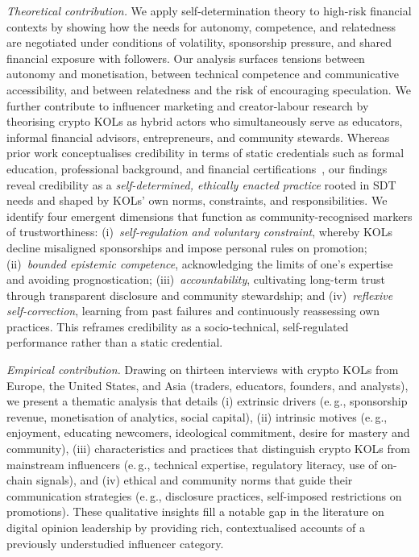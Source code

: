 \emph{Theoretical contribution.} We apply self-determination theory to high-risk financial contexts by showing how the needs for autonomy, competence, and relatedness are negotiated under conditions of volatility, sponsorship pressure, and shared financial exposure with followers. Our analysis surfaces tensions between autonomy and monetisation, between technical competence and communicative accessibility, and between relatedness and the risk of encouraging speculation. We further contribute to influencer marketing and creator-labour research by theorising crypto KOLs as hybrid actors who simultaneously serve as educators, informal financial advisors, entrepreneurs, and community stewards. Whereas prior work conceptualises credibility in terms of static credentials such as formal education, professional background, and financial certifications~\cite{NurhandayaniWhoDeserves2025}, our findings reveal credibility as a \emph{self-determined, ethically enacted practice} rooted in SDT needs and shaped by KOLs' own norms, constraints, and responsibilities. We identify four emergent dimensions that function as community-recognised markers of trustworthiness: (i)~\emph{self-regulation and voluntary constraint}, whereby KOLs decline misaligned sponsorships and impose personal rules on promotion; (ii)~\emph{bounded epistemic competence}, acknowledging the limits of one's expertise and avoiding prognostication; (iii)~\emph{accountability}, cultivating long-term trust through transparent disclosure and community stewardship; and (iv)~\emph{reflexive self-correction}, learning from past failures and continuously reassessing own practices. This reframes credibility as a socio-technical, self-regulated performance rather than a static credential.

\emph{Empirical contribution.} Drawing on thirteen interviews with crypto KOLs from Europe, the United States, and Asia (traders, educators, founders, and analysts), we present a thematic analysis that details (i) extrinsic drivers (e.\,g., sponsorship revenue, monetisation of analytics, social capital), (ii) intrinsic motives (e.\,g., enjoyment, educating newcomers, ideological commitment, desire for mastery and community), (iii) characteristics and practices that distinguish crypto KOLs from mainstream influencers (e.\,g., technical expertise, regulatory literacy, use of on-chain signals), and (iv) ethical and community norms that guide their communication strategies (e.\,g., disclosure practices, self-imposed restrictions on promotions). These qualitative insights fill a notable gap in the literature on digital opinion leadership by providing rich, contextualised accounts of a previously understudied influencer category.

